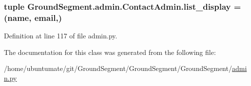 \subsubsection[{list\+\_\+display}]{\setlength{\rightskip}{0pt plus 5cm}tuple Ground\+Segment.\+admin.\+Contact\+Admin.\+list\+\_\+display = (\textquotesingle{}name\textquotesingle{}, \textquotesingle{}email\textquotesingle{},)\hspace{0.3cm}{\ttfamily [static]}}\label{class_ground_segment_1_1admin_1_1_contact_admin_a6dda75f284db38fa53b8b9d4f9116459}


Definition at line 117 of file admin.\+py.



The documentation for this class was generated from the following file\+:\begin{DoxyCompactItemize}
\item 
/home/ubuntumate/git/\+Ground\+Segment/\+Ground\+Segment/\+Ground\+Segment/\hyperlink{admin_8py}{admin.\+py}\end{DoxyCompactItemize}

